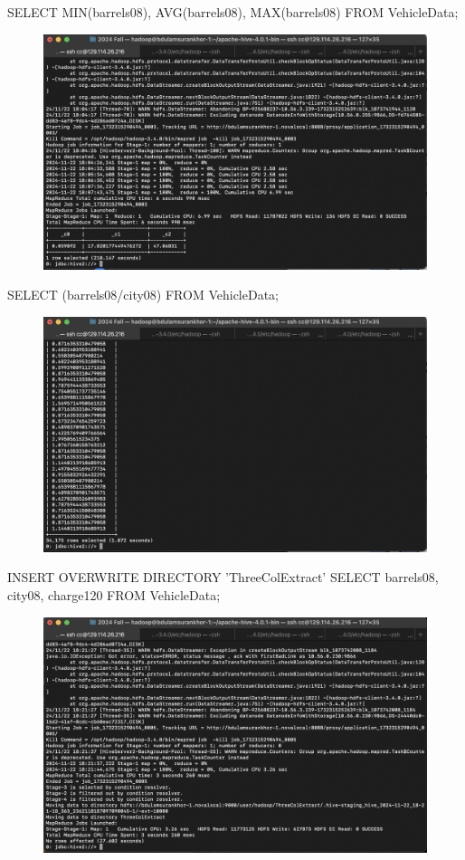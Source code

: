 \documentclass{article}
\begin{document}
SELECT MIN(barrels08), AVG(barrels08), MAX(barrels08) FROM VehicleData;

\begin{figure}[H]
  \centering
  \includegraphics[width=\textwidth]{image9.png}
\end{figure}

SELECT (barrels08/city08) FROM VehicleData;

\begin{figure}[H]
  \centering
  \includegraphics[width=\textwidth]{image10.png}
\end{figure}

INSERT OVERWRITE DIRECTORY 'ThreeColExtract'
SELECT barrels08, city08, charge120
FROM VehicleData;

\begin{figure}[H]
  \centering
  \includegraphics[width=\textwidth]{image11.png}
\end{figure}
\end{document}
